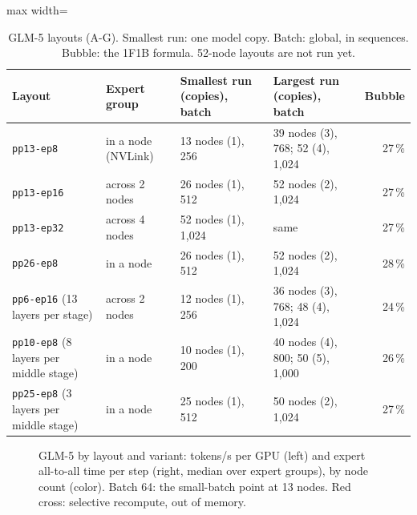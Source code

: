 \begin{table}[h]
  \caption{GLM-5 layouts (A-G). Smallest run: one model copy. Batch: global, in sequences. Bubble: the 1F1B formula. 52-node layouts are not run yet.}
  \label{tab:ag}
  \centering\small
  \begin{adjustbox}{max width=\linewidth}
  \begin{tabular}{llllr}
    \toprule
    Layout & Expert group & Smallest run (copies), batch & Largest run (copies), batch & Bubble \est{} \\
    \midrule
    \texttt{pp13-ep8}  & in a node (NVLink) & 13 nodes (1), 256 & 39 nodes (3), 768; 52 (4), 1{,}024 & 27\,\% \\
    \texttt{pp13-ep16} & across 2 nodes & 26 nodes (1), 512 & 52 nodes (2), 1{,}024 & 27\,\% \\
    \texttt{pp13-ep32} & across 4 nodes & 52 nodes (1), 1{,}024 & same & 27\,\% \\
    \texttt{pp26-ep8}  & in a node & 26 nodes (1), 512 & 52 nodes (2), 1{,}024 & 28\,\% \\
    \texttt{pp6-ep16} (13 layers per stage) & across 2 nodes & 12 nodes (1), 256 & 36 nodes (3), 768; 48 (4), 1{,}024 & 24\,\% \\
    \texttt{pp10-ep8} (8 layers per middle stage) & in a node & 10 nodes (1), 200 & 40 nodes (4), 800; 50 (5), 1{,}000 & 26\,\% \\
    \texttt{pp25-ep8} (3 layers per middle stage) & in a node & 25 nodes (1), 512 & 50 nodes (2), 1{,}024 & 27\,\% \\
    \bottomrule
  \end{tabular}
  \end{adjustbox}
\end{table}

\begin{figure}[h]
  \centering{}
  \caption{GLM-5 by layout and variant: tokens/s per GPU (left) and expert all-to-all time per step (right, median over expert groups), by node count (color). Batch 64: the small-batch point at 13 nodes. Red cross: selective recompute, out of memory. }
  \label{fig:glm_layouts}
\end{figure}

